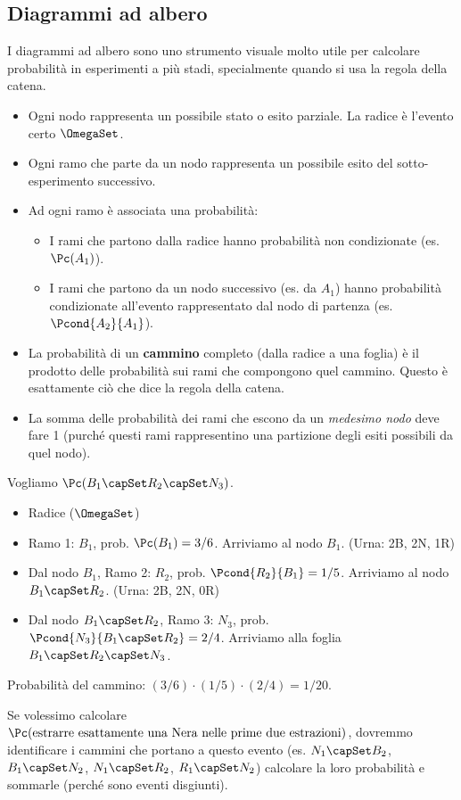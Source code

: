 \subsection{Diagrammi ad albero}
I diagrammi ad albero sono uno strumento visuale molto utile per calcolare probabilità in esperimenti a più stadi, specialmente quando si usa la regola della catena.
\begin{itemize}
    \item Ogni nodo rappresenta un possibile stato o esito parziale. La radice è l'evento certo $\OmegaSet$.
    \item Ogni ramo che parte da un nodo rappresenta un possibile esito del sotto-esperimento successivo.
    \item Ad ogni ramo è associata una probabilità:
        \begin{itemize}
            \item I rami che partono dalla radice hanno probabilità non condizionate (es. $\Pc(A_1)$).
            \item I rami che partono da un nodo successivo (es. da $A_1$) hanno probabilità condizionate all'evento rappresentato dal nodo di partenza (es. $\Pcond{A_2}{A_1}$).
        \end{itemize}
    \item La probabilità di un \textbf{cammino} completo (dalla radice a una foglia) è il prodotto delle probabilità sui rami che compongono quel cammino. Questo è esattamente ciò che dice la regola della catena.
    \item La somma delle probabilità dei rami che escono da un \textit{medesimo nodo} deve fare 1 (purché questi rami rappresentino una partizione degli esiti possibili da quel nodo).
\end{itemize}

\begin{example}
Vogliamo $\Pc(B_1 \capSet R_2 \capSet N_3)$.
\begin{itemize}
    \item Radice ($\OmegaSet$)
    \item Ramo 1: $B_1$, prob. $\Pc(B_1) = 3/6$. Arriviamo al nodo $B_1$. (Urna: 2B, 2N, 1R)
    \item Dal nodo $B_1$, Ramo 2: $R_2$, prob. $\Pcond{R_2}{B_1} = 1/5$. Arriviamo al nodo $B_1 \capSet R_2$. (Urna: 2B, 2N, 0R)
    \item Dal nodo $B_1 \capSet R_2$, Ramo 3: $N_3$, prob. $\Pcond{N_3}{B_1 \capSet R_2} = 2/4$. Arriviamo alla foglia $B_1 \capSet R_2 \capSet N_3$.
\end{itemize}
Probabilità del cammino: $(3/6) \cdot (1/5) \cdot (2/4) = 1/20$.

Se volessimo calcolare $\Pc(\text{estrarre esattamente una Nera nelle prime due estrazioni})$, dovremmo identificare i cammini che portano a questo evento (es. $N_1 \capSet B_2$, $B_1 \capSet N_2$, $N_1 \capSet R_2$, $R_1 \capSet N_2$) calcolare la loro probabilità e sommarle (perché sono eventi disgiunti).
\end{example}

